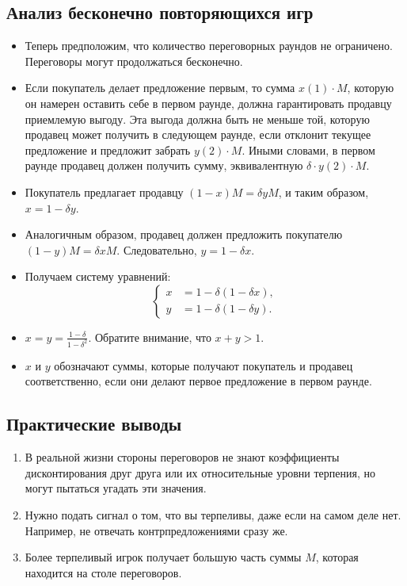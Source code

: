 \subsection{Анализ бесконечно повторяющихся игр}

\begin{itemize}
\item Теперь предположим, что количество переговорных раундов не ограничено. Переговоры могут продолжаться бесконечно.

\item Если покупатель делает предложение первым, то сумма $x(1) \cdot M$, которую он намерен оставить себе в первом раунде, должна гарантировать продавцу приемлемую выгоду. Эта выгода должна быть не меньше той, которую продавец может получить в следующем раунде, если отклонит текущее предложение и предложит забрать $y(2) \cdot M$. Иными словами, в первом раунде продавец должен получить сумму, эквивалентную $\delta \cdot y(2) \cdot M$.

\item Покупатель предлагает продавцу $(1 - x) M = \delta y M$, и таким образом, $x = 1 - \delta y$.

\item Аналогичным образом, продавец должен предложить покупателю $(1 - y) M = \delta x M$. Следовательно, $y = 1 - \delta x$.

\item Получаем систему уравнений:
\begin{equation}
\begin{cases}
    x &= 1 - \delta (1 - \delta x), \\
    y &= 1 - \delta (1 - \delta y).
\end{cases}
\end{equation}

\item $x = y = \frac{1-\delta}{1-\delta^2}$. Обратите внимание, что $x+y > 1$.

\item $x$ и $y$ обозначают суммы, которые получают покупатель и продавец соответственно, если они делают первое предложение в первом раунде.

\end{itemize}


\subsection*{Практические выводы}

\begin{enumerate}

\item В реальной жизни стороны переговоров не знают коэффициенты дисконтирования друг друга или их относительные уровни терпения, но могут пытаться угадать эти значения.

\item Нужно подать сигнал о том, что вы терпеливы, даже если на самом деле нет. Например, не отвечать контрпредложениями сразу же.

\item Более терпеливый игрок получает большую часть суммы $M$, которая находится на столе переговоров.

\end{enumerate}